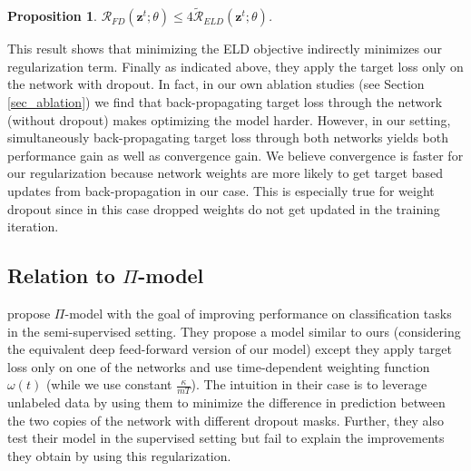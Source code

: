 \documentclass{article} \usepackage{iclr2018_conference,times}
\newtheorem{proposition}{Proposition}
\begin{document}
\begin{proposition}
\label{prop_eld}
$\mathcal{R}_{FD}(\mathbf{z}^{t}; \theta) \leq 4 \mathcal{\tilde{R}}_{ELD}(\mathbf{z}^{t}; \theta)$.
\end{proposition}
This result shows that minimizing the ELD objective indirectly minimizes our regularization term.
Finally as indicated above, they apply the target loss only on the network with dropout. In fact, in our own ablation studies (see Section \ref{sec_ablation}) we find that back-propagating target loss through the network (without dropout) makes optimizing the model harder. However, in our setting, simultaneously back-propagating target loss through both networks yields both performance gain as well as convergence gain. We believe convergence is faster for our regularization because network weights are more likely to get target based updates from back-propagation in our case. This is especially true for weight dropout \citep{wan2013regularization} since in this case dropped weights do not get updated in the training iteration.

\subsection{Relation to \texorpdfstring{$\Pi$}{TEXT}-model}

\citet{laine2016temporal} propose $\Pi$-model with the goal of improving performance on classification tasks in the semi-supervised setting. They propose a model similar to ours (considering the equivalent deep feed-forward version of our model) except they apply target loss only on one of the networks and use time-dependent weighting function $\omega(t)$ (while we use constant $\frac{\kappa}{mT}$). The intuition in their case is to leverage unlabeled data by using them to minimize the difference in prediction between the two copies of the network with different dropout masks. Further, they also test their model in the supervised setting but fail to explain the improvements they obtain by using this regularization.
\end{document}
